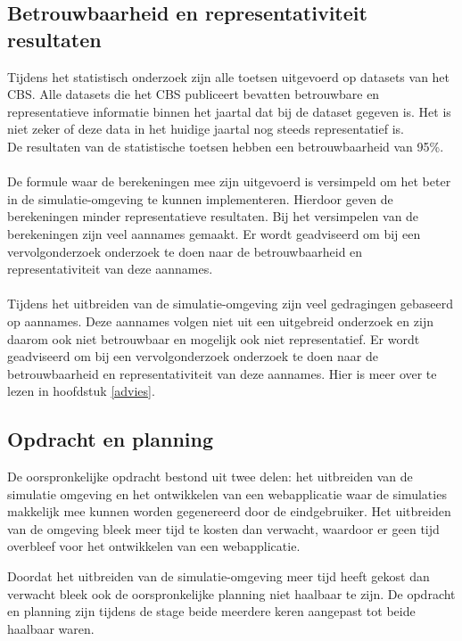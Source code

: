 \documentclass[12pt, letterpaper]{article}
\begin{document}
\begin{appendices}
\subsection{Betrouwbaarheid en representativiteit resultaten}
Tijdens het statistisch onderzoek zijn alle toetsen uitgevoerd op datasets van het CBS. Alle datasets die het CBS publiceert bevatten betrouwbare en representatieve informatie binnen het jaartal dat bij de dataset gegeven is. Het is niet zeker of deze data in het huidige jaartal nog steeds representatief is. 
\\
De resultaten van de statistische toetsen hebben een betrouwbaarheid van 95\%. 
\\ \\
De formule waar de berekeningen mee zijn uitgevoerd is versimpeld om het beter in de simulatie-omgeving te kunnen implementeren. Hierdoor geven de berekeningen minder representatieve resultaten. Bij het versimpelen van de berekeningen zijn veel aannames gemaakt. Er wordt geadviseerd om bij een vervolgonderzoek onderzoek te doen naar de betrouwbaarheid en representativiteit van deze aannames.
\\ \\
Tijdens het uitbreiden van de simulatie-omgeving zijn veel gedragingen gebaseerd op aannames. Deze aannames volgen niet uit een uitgebreid onderzoek en zijn daarom ook niet betrouwbaar en mogelijk ook niet representatief. Er wordt geadviseerd om bij een vervolgonderzoek onderzoek te doen naar de betrouwbaarheid en representativiteit van deze aannames. Hier is meer over te lezen in hoofdstuk \ref{advies}.

\subsection{Opdracht en planning}
De oorspronkelijke opdracht bestond uit twee delen: het uitbreiden van de simulatie omgeving en het ontwikkelen van een webapplicatie waar de simulaties makkelijk mee kunnen worden gegenereerd door de eindgebruiker. Het uitbreiden van de omgeving bleek meer tijd te kosten dan verwacht, waardoor er geen tijd overbleef voor het ontwikkelen van een webapplicatie.

Doordat het uitbreiden van de simulatie-omgeving meer tijd heeft gekost dan verwacht bleek ook de oorspronkelijke planning niet haalbaar te zijn. De opdracht en planning zijn tijdens de stage beide meerdere keren aangepast tot beide haalbaar waren. 


\end{appendices}
\end{document}

